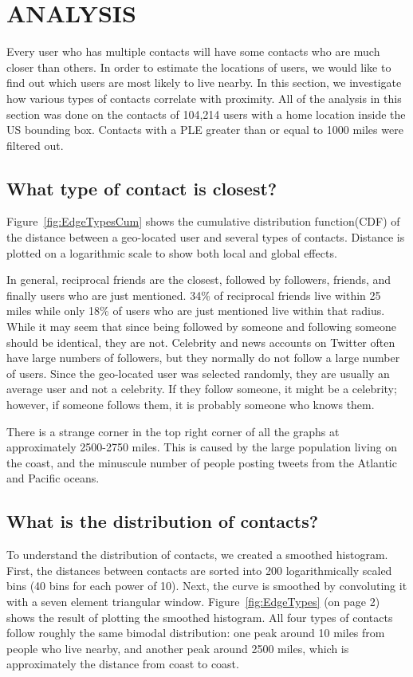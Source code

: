 
\chapter{\uppercase{Analysis}}

Every user who has multiple contacts will have some contacts who are much
closer than others. In order to estimate the locations of users, we would like
to find out which users are most likely to live nearby.  In this section, we
investigate how various types of contacts correlate with proximity.
All of the analysis in this section was done on the contacts of 104,214 users
with a home location inside the US bounding box. Contacts with a PLE greater
than or equal to 1000 miles were filtered out.

\section{What type of contact is closest?}

Figure~\ref{fig:EdgeTypesCum} shows the cumulative distribution
function(CDF) of the distance between a geo-located user and several types of
contacts.
Distance is plotted on a logarithmic scale to show both local and
global effects.

In general, reciprocal friends are the closest, followed by followers, friends,
and finally users who are just mentioned.
34\% of reciprocal friends live within 25 miles while only 18\% of users who are
just mentioned live within that radius.
While it may seem that since being followed by someone and following someone
should be identical, they are not.
Celebrity and news accounts on Twitter often have large numbers of followers,
but they normally do not follow a large number of users.
Since the geo-located user was selected randomly, they are usually an average
user and not a celebrity.
If they follow someone, it might be a celebrity; however, if someone follows
them, it is probably someone who knows them.

There is a strange corner in the top right corner of all the graphs at
approximately 2500-2750 miles.
This is caused by the large population living on the coast, and the minuscule
number of people posting tweets from the Atlantic and Pacific oceans.

\section{What is the distribution of contacts?}
To understand the distribution of contacts, we created a smoothed histogram.
First, the distances between contacts are sorted into 200 logarithmically
scaled bins (40 bins for each power of 10). Next, the curve is smoothed by
convoluting it with a seven element triangular window.
Figure~\ref{fig:EdgeTypes} (on page 2) shows the result of plotting the
smoothed histogram.
All four types of contacts follow roughly the same bimodal
distribution: one peak around 10 miles from people who live nearby, and another
peak around 2500 miles, which is approximately the distance from coast to
coast.

